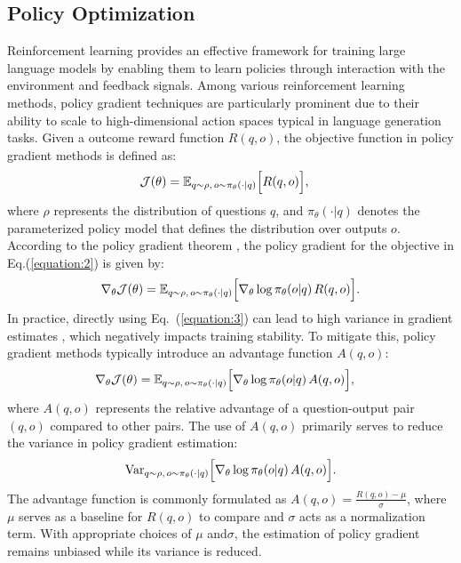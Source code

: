 \documentclass{article}
\theoremstyle{plain}
\theoremstyle{definition}
\theoremstyle{remark}
\begin{document}
\subsection{Policy Optimization}
Reinforcement learning provides an effective framework for training large language models by enabling them to learn policies through interaction with the environment and feedback signals. Among various reinforcement learning methods, policy gradient techniques are particularly prominent due to their ability to scale to high-dimensional action spaces typical in language generation tasks. Given a outcome reward function $R(q,o)$, the objective function in policy gradient methods is defined as:
\begin{align}
\label{equation:2}
    \mathcal{J}(\theta)&=\mathbb{E}_{q\sim\rho,\, o\sim\pi_\theta(\cdot| q)}\Bigl[R(q,o)\Bigr],
\end{align}
where $\rho$ represents the distribution of questions $q$, and $\pi_\theta(\cdot| q)$ denotes the parameterized policy model that defines the distribution over outputs $o$. According to the policy gradient theorem \citep{sutton1999policy}, the policy gradient for the objective in Eq.(\ref{equation:2}) is given by:
\begin{align}
\label{equation:3}
\nabla_\theta \mathcal{J}(\theta)= \mathbb{E}_{q\sim\rho,\, o\sim\pi_\theta(\cdot| q)}\Bigl[\nabla_\theta \log \pi_\theta(o| q)\, R(q,o)\Bigr].
\end{align}
In practice, directly using Eq.~(\ref{equation:3}) can lead to high variance in gradient estimates \citep{barto2021reinforcement}, which negatively impacts training stability. To mitigate this, policy gradient methods typically introduce an advantage function $A(q,o)$:
\begin{align}
\label{equation:4}
\nabla_\theta \mathcal{J}(\theta)&= \mathbb{E}_{q\sim\rho,\, o\sim\pi_\theta(\cdot| q)}\Bigl[\nabla_\theta \log \pi_\theta(o| q)\, A(q,o)\Bigr],
\end{align}
where $A(q,o)$ represents the relative advantage of a question-output pair $(q,o)$ compared to other pairs. The use of $A(q,o)$ primarily serves to reduce the variance in policy gradient estimation:
\begin{align}
\mathrm{Var}_{q\sim\rho,\, o\sim\pi_\theta(\cdot| q)}\Bigl[\nabla_\theta \log \pi_\theta(o| q)\, A(q,o)\Bigr].
\end{align}
The advantage function is commonly formulated as $A(q,o)=\frac{R(q,o)-\mu}{\sigma}$, where $\mu$ serves as a baseline for $R(q,o)$ to compare and $\sigma$ acts as a normalization term. With appropriate choices of $\mu$ and$\sigma$, the estimation of policy gradient remains unbiased while its variance is reduced.
\end{document}
